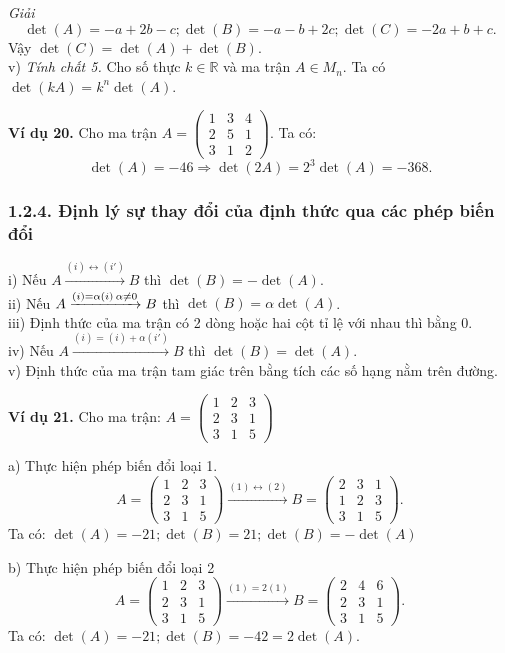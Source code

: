 \textit{Giải}
\[
\det(A) = -a + 2b - c; \det(B) = -a - b + 2c; \det(C) = -2a + b + c.
\]
Vậy \(\det(C) = \det(A) + \det(B)\).\\
v) \textit{Tính chất 5.} Cho số thực \(k \in \mathbb{R}\) và ma trận \(A \in M_n\). Ta có \(\det(kA) = k^n \det(A)\).

\textbf{Ví dụ 20.} Cho ma trận \(A = \begin{pmatrix}
1 & 3 & 4 \\
2 & 5 & 1 \\
3 & 1 & 2
\end{pmatrix} \).
Ta có:
\[
\det(A) = -46 \Rightarrow \det(2A) = 2^3 \det(A) = -368.
\]

\subsubsection*{1.2.4. Định lý sự thay đổi của định thức qua các phép biến đổi}

i) Nếu \(A \xrightarrow{(i) \leftrightarrow (i')} B\) thì \(\det(B) = -\det(A)\).\\
ii) Nếu \(A \xrightarrow{(i)=\alpha(i) \\ \alpha \neq 0} B\) thì \(\det(B) = \alpha \det(A)\).\\
iii) Định thức của ma trận có 2 dòng hoặc hai cột tỉ lệ với nhau thì bằng 0.\\
iv) Nếu \(A \xrightarrow{(i)=(i)+\alpha(i')} B\) thì \(\det(B) = \det(A)\).\\
v) Định thức của ma trận tam giác trên bằng tích các số hạng nằm trên đường.

\textbf{Ví dụ 21.} Cho ma trận: \(A = \begin{pmatrix}
1 & 2 & 3 \\
2 & 3 & 1 \\
3 & 1 & 5
\end{pmatrix} \)

a) Thực hiện phép biến đổi loại 1.
\[
A = \begin{pmatrix}
1 & 2 & 3 \\
2 & 3 & 1 \\
3 & 1 & 5
\end{pmatrix} \xrightarrow{(1) \leftrightarrow (2)} B = \begin{pmatrix}
2 & 3 & 1 \\
1 & 2 & 3 \\
3 & 1 & 5
\end{pmatrix}.
\]
Ta có: \(\det(A) = -21; \det(B) = 21; \det(B) = -\det(A)\)

b) Thực hiện phép biến đổi loại 2
\[
A = \begin{pmatrix}
1 & 2 & 3 \\
2 & 3 & 1 \\
3 & 1 & 5
\end{pmatrix} \xrightarrow{(1)=2(1)} B = \begin{pmatrix}
2 & 4 & 6 \\
2 & 3 & 1 \\
3 & 1 & 5
\end{pmatrix}.
\]
Ta có: \(\det(A) = -21; \det(B) = -42 = 2\det(A)\).

